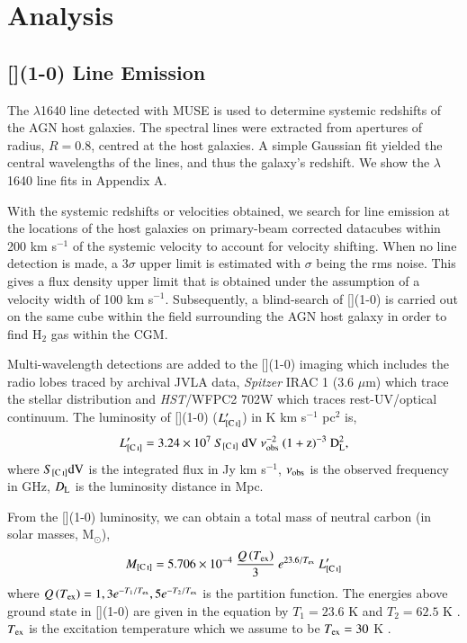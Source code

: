 \section{Analysis}
\subsection{[](1-0) Line Emission}
The  $\lambda$1640 line detected with MUSE is used to determine systemic redshifts of the AGN host galaxies. The spectral lines were extracted from apertures of radius, $R=0.8$\arcsec, centred at the host galaxies. A simple Gaussian fit yielded the central wavelengths of the lines, and thus the galaxy's  redshift. We show the  $\lambda$1640 line fits in Appendix A.

With the systemic redshifts or velocities obtained, we search for line emission at the locations of the host galaxies on primary-beam corrected datacubes within 200 km s$^{-1}$ of the systemic velocity to account for velocity shifting. When no line detection is made, a $3\sigma$ upper limit is estimated with $\sigma$ being the rms noise. This gives a flux density upper limit that is obtained under the assumption of a velocity width of 100 km s$^{-1}.$ Subsequently, a blind-search of [](1-0) is carried out on the same cube within the field surrounding the AGN host galaxy in order to find H$_2$ gas within the CGM.

Multi-wavelength detections are added to the [](1-0) imaging which includes the radio lobes traced by archival JVLA data, {\it Spitzer} IRAC 1 (3.6 $\mu$m) which trace the stellar distribution and {\it HST}/WFPC2 702W which traces rest-UV/optical continuum. The luminosity of [](1-0) ($L'_{[\ion{C}{i}]}$) in K km s$^{-1}$ pc$^2$ is, 
\begin{equation}
L'_{[\ion{C}{I}]} = 3.24 \times 10^{7}~S_{[\ion{C}{I}]}~\rm{dV}~\nu_{\rm obs}^{-2}~(1+z)^{-3}~D_{\rm L}^{2},
\end{equation} 
where $S_{[\ion{C}{I}]}\rm dV$ is the integrated flux in Jy km s$^{-1}$, $\nu_{\rm obs}$ is the observed frequency in GHz, $D_{\rm L}$ is the luminosity distance in Mpc. 

From the [](1-0) luminosity, we can obtain a total mass of neutral carbon (in solar masses, M$_\odot$),
\begin{equation}
M_{[\ion{C}{I}]} = 5.706 \times 10^{-4}~\frac{ Q\left(T_{\rm ex}\right) }{3}~e^{23.6/T_{\rm ex}}~L'_{[\ion{C}{I}]}
\end{equation} where $Q\left(T_{\rm ex}\right) = 1,3e^{-T_1/T_{\rm ex}},5e^{-T_2/T_{\rm ex}}$ is the partition function. The energies above ground state in [](1-0) are given in the equation by $T_1 = 23.6$ K and $T_2 = 62.5$ K \citep{Walter2011}. $T_{\rm ex}$ is the excitation temperature which we assume to be $T_{\rm ex} = 30$ K \citep{Weiss2005}. 

